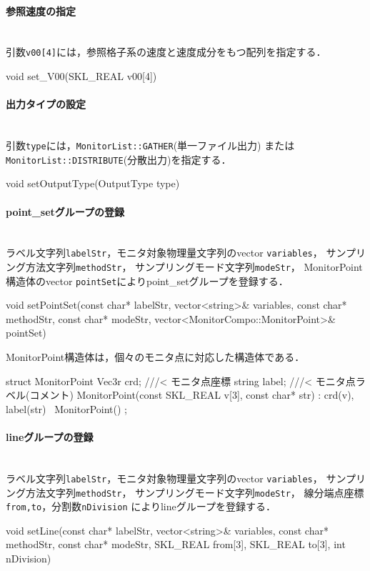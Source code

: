 %
\paragraph{参照速度の指定}\mbox{}\\
引数{\tt v00[4]}には，参照格子系の速度と速度成分をもつ配列を指定する．
{\small
\begin{program}
void set_V00(SKL_REAL v00[4]) 
\end{program}
}

%
\paragraph{出力タイプの設定}\mbox{}\\
引数{\tt type}には，{\tt MonitorList::GATHER}(単一ファイル出力)
または{\tt MonitorList::DISTRIBUTE}(分散出力)を指定する．
{\small
\begin{program}
void setOutputType(OutputType type)
\end{program}
}

%
\paragraph{point\_setグループの登録}\mbox{}\\
ラベル文字列{\tt labelStr}，モニタ対象物理量文字列のvector {\tt variables}，
サンプリング方法文字列{\tt methodStr}，
サンプリングモード文字列{\tt modeStr}，
MonitorPoint構造体のvector {\tt pointSet}によりpoint\_setグループを登録する．
\pagebreak
{\small
\begin{program}
void setPointSet(const char* labelStr, vector<string>& variables,
                 const char* methodStr, const char* modeStr,
                 vector<MonitorCompo::MonitorPoint>& pointSet)
\end{program}
}
MonitorPoint構造体は，個々のモニタ点に対応した構造体である．

{\small
\begin{program}
struct MonitorPoint {
  Vec3r crd;      ///< モニタ点座標
  string label;   ///< モニタ点ラベル(コメント)
  MonitorPoint(const SKL_REAL v[3], const char* str) : crd(v), label(str) {}
  ~MonitorPoint() {}
};
\end{program}
}

%
\paragraph{lineグループの登録}\mbox{}\\
ラベル文字列{\tt labelStr}，モニタ対象物理量文字列のvector {\tt variables}，
サンプリング方法文字列{\tt methodStr}，
サンプリングモード文字列{\tt modeStr}，
線分端点座標{\tt from,to}，分割数{\tt nDivision}
によりlineグループを登録する．
{\small
\begin{program}
void setLine(const char* labelStr, vector<string>& variables,
             const char* methodStr, const char* modeStr,
             SKL_REAL from[3], SKL_REAL to[3], int nDivision)
\end{program}
}

